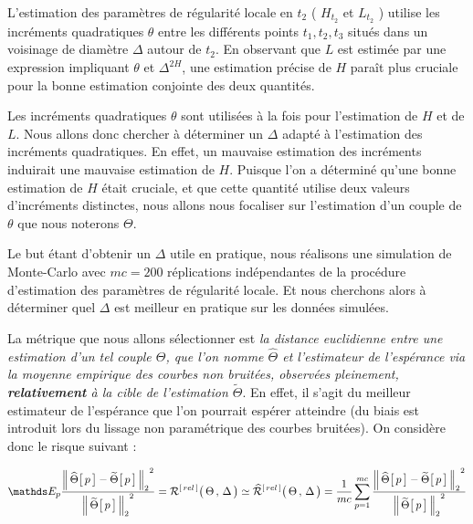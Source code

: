 
L'estimation des paramètres de régularité locale en $t_2$ ( $H_{t_2}$ et $L_{t_2}$ ) utilise les incréments quadratiques $\theta$ entre les différents points $t_1, t_2, t_3$ situés dans un voisinage de diamètre $\Delta$ autour de $t_2$.
En observant que $L$ est estimée par une expression impliquant $\theta$ et $\Delta^{2 H}$, une estimation précise de $H$ paraît plus cruciale pour la bonne estimation conjointe des deux quantités. 


Les incréments quadratiques $\theta$ sont utilisées à la fois pour l'estimation de $H$ et de $L$. Nous allons donc chercher à déterminer un $\Delta$ adapté à l'estimation des incréments quadratiques. En effet, un mauvaise estimation des incréments induirait une mauvaise estimation de $H$. Puisque l'on a déterminé qu'une bonne estimation de $H$ était cruciale, et que cette quantité utilise deux valeurs d'incréments distinctes, nous allons nous focaliser sur l'estimation d'un couple de $\theta$ que nous noterons $\Theta$.

\bigskip

Le but étant d'obtenir un $\Delta$ utile en pratique, nous réalisons une simulation de Monte-Carlo avec $mc=200$ réplications indépendantes de la procédure d'estimation des paramètres de régularité locale. Et nous cherchons alors à déterminer quel $\Delta$ est meilleur en pratique sur les données simulées.

\bigskip

La métrique que nous allons sélectionner est \emph{la distance euclidienne entre une estimation d'un tel couple $\Theta$, que l'on nomme $\widehat \Theta$ et l'estimateur de l'espérance via la moyenne empirique des courbes non bruitées, observées pleinement, \textbf{relativement} à la cible de l'estimation $\widetilde \Theta$}. En effet, il s'agit du meilleur estimateur de l'espérance que l'on pourrait espérer atteindre (du biais est introduit lors du lissage non paramétrique des courbes bruitées). On considère donc le risque suivant :


\begin{equation}
	{\mathds E_p} \frac{{\distnorme 2 {\widehat \Theta\bigl[\, p \,\bigr]} {\widetilde \Theta \bigl[ \,p \,\bigr]}}^2}{{\norme 2 {\widetilde \Theta \bigl[ \,p \,\bigr]}}^2}
	=
	{\mathcal R}^{[\,rel\,]} \bigl( \, \Theta \, , \, \Delta \, \bigr)
	\simeq
\widehat{\mathcal R}^{[\,rel\,]} \bigl( \, \Theta \, , \, \Delta \, \bigr)
	=
	\frac 1 {mc} \sum\limits_{p=1}^{mc} \frac{{\distnorme 2 {\widehat \Theta\bigl[\, p \,\bigr]} {\widetilde \Theta \bigl[ \,p \,\bigr]}}^2}{{\norme 2 {\widetilde \Theta \bigl[ \,p \,\bigr]}}^2}
\end{equation}

